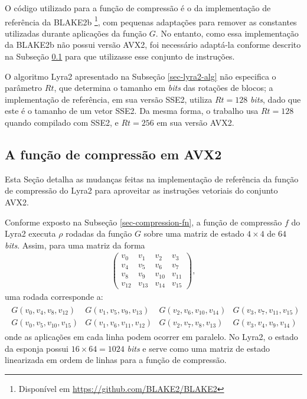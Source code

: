 \documentclass{article}
\begin{document}
O código utilizado para a função de compressão é o da implementação de
referência da BLAKE2b \footnote{Disponível em
  \url{https://github.com/BLAKE2/BLAKE2}}, com pequenas adaptações para
remover as constantes utilizadas durante aplicações da função $G$. No
entanto, como essa implementação da BLAKE2b não possui versão AVX2, foi
necessário adaptá-la conforme descrito na Subseção \ref{sec-compression-fn-avx2}
para que utilizasse esse conjunto de instruções.

O algoritmo Lyra2 apresentado na Subseção \ref{sec-lyra2-alg} não
especifica o parâmetro $Rt$, que determina o tamanho em \emph{bits} das
rotações de blocos; a implementação de referência, em sua versão SSE2,
utiliza $Rt = 128$ \emph{bits}, dado que este é o tamanho de um vetor SSE2.
Da mesma forma, o trabalho usa $Rt = 128$ quando compilado com
SSE2, e $Rt = 256$ em sua versão AVX2.

\subsection{A função de compressão em AVX2 }\label{sec-compression-fn-avx2}

Esta Seção detalha as mudanças feitas na implementação de referência da
função de compressão do Lyra2 para aproveitar as instruções vetoriais do
conjunto AVX2.

Conforme exposto na Subseção \ref{sec-compression-fn}, a função de
compressão $f$ do Lyra2 executa $\rho$ rodadas da função $G$ sobre uma
matriz de estado $4 \times 4$ de $64$ \emph{bits}. Assim, para uma matriz
da forma
\begin{align*}
\left(
\begin{matrix}
v_{0} & v_{1} & v_{2} & v_{3} \\
v_{4} & v_{5} & v_{6} & v_{7} \\
v_{8} & v_{9} & v_{10} & v_{11} \\
v_{12} & v_{13} & v_{14} & v_{15}
\end{matrix}
\right),
\end{align*}
uma rodada corresponde a:
\begin{align*}
\begin{matrix}
G(v_{0}, v_{4}, v_{8}, v_{12}) & G(v_{1}, v_{5}, v_{9}, v_{13}) & G(v_{2}, v_{6}, v_{10}, v_{14}) & G(v_{3}, v_{7}, v_{11}, v_{15}) \\
G(v_{0}, v_{5}, v_{10}, v_{15}) & G(v_{1}, v_{6}, v_{11}, v_{12}) & G(v_{2}, v_{7}, v_{8}, v_{13}) & G(v_{3}, v_{4}, v_{9}, v_{14})
\end{matrix}
\end{align*}
onde as aplicações em cada linha podem ocorrer em paralelo. No Lyra2, o estado
da esponja possui $16 \times 64 = 1024$ \emph{bits} e serve como uma
matriz de estado linearizada em ordem de linhas para a função de compressão.
\end{document}
